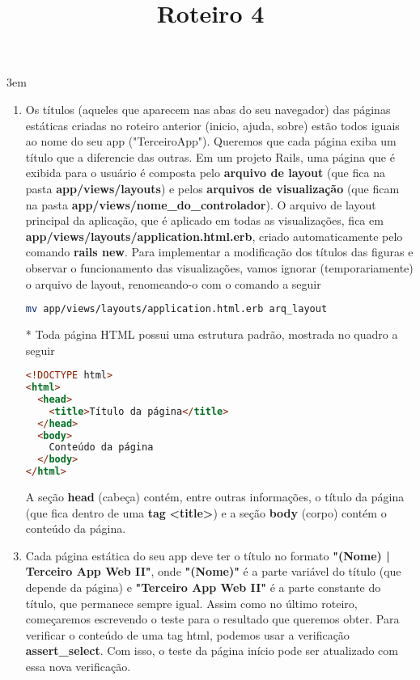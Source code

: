 \documentclass[a4paper,12pt]{article}
\title{Roteiro 4}
\begin{document}
\maketitle

\emergencystretch 3em

\setlength{\leftmargini}{0pt}
\begin{enumerate}
  \item Os títulos (aqueles que aparecem nas abas do seu navegador) das páginas estáticas criadas no roteiro anterior (inicio, ajuda, sobre) estão todos iguais ao nome do seu app ("TerceiroApp"). Queremos que cada página exiba um título que a diferencie das outras. Em um projeto Rails, uma página que é exibida para o usuário é composta pelo \textbf{arquivo de layout} (que fica na pasta \textbf{app/views/layouts}) e pelos \textbf{arquivos de visualização} (que ficam na pasta \textbf{app/views/nome\_do\_controlador}). O arquivo de layout principal da aplicação, que é aplicado em todas as visualizações, fica em \textbf{app/views/layouts/application.html.erb}, criado automaticamente pelo comando \textbf{rails new}. Para implementar a modificação dos títulos das figuras e observar o funcionamento das visualizações, vamos ignorar (temporariamente) o arquivo de layout, renomeando-o com o comando a seguir

  \begin{lstlisting}[language=Bash, title={terminal, dentro da pasta do terceiro app}]
mv app/views/layouts/application.html.erb arq_layout
  \end{lstlisting}

  \item [*] Toda página HTML possui uma estrutura padrão, mostrada no quadro a seguir

  \begin{lstlisting}[language=html]
<!DOCTYPE html>
<html>
  <head>
    <title>Título da página</title>
  </head>
  <body>
    Conteúdo da página
  </body>
</html>
  \end{lstlisting}

  A seção \textbf{head} (cabeça) contém, entre outras informações, o título da página (que fica dentro de uma \textbf{tag} \textbf{<title>}) e a seção \textbf{body} (corpo) contém o conteúdo da página.

  \item Cada página estática do seu app deve ter o título no formato \textbf{"{}(Nome) | Terceiro App Web II"}, onde \textbf{"(Nome)"} é a parte variável do título (que depende da página) e \textbf{"Terceiro App Web II"} é a parte constante do título, que permanece sempre igual. Assim como no último roteiro, começaremos escrevendo o teste para o resultado que queremos obter. Para verificar o conteúdo de uma tag html, podemos usar a verificação \textbf{assert\_select}. Com isso, o teste da página início pode ser atualizado com essa nova verificação.


\end{enumerate}
\end{document}
